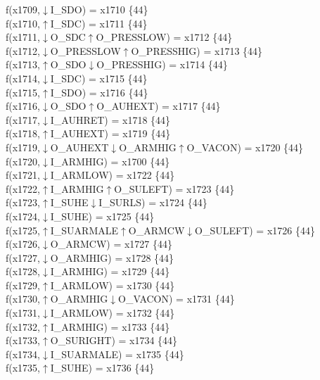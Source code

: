 f(x1709,$\downarrow$I\_SDO) = x1710 \{44\} \\  
f(x1710,$\uparrow$I\_SDC) = x1711 \{44\} \\  
f(x1711,$\downarrow$O\_SDC$\uparrow$O\_PRESSLOW) = x1712 \{44\} \\  
f(x1712,$\downarrow$O\_PRESSLOW$\uparrow$O\_PRESSHIG) = x1713 \{44\} \\  
f(x1713,$\uparrow$O\_SDO$\downarrow$O\_PRESSHIG) = x1714 \{44\} \\  
f(x1714,$\downarrow$I\_SDC) = x1715 \{44\} \\  
f(x1715,$\uparrow$I\_SDO) = x1716 \{44\} \\  
f(x1716,$\downarrow$O\_SDO$\uparrow$O\_AUHEXT) = x1717 \{44\} \\  
f(x1717,$\downarrow$I\_AUHRET) = x1718 \{44\} \\  
f(x1718,$\uparrow$I\_AUHEXT) = x1719 \{44\} \\  
f(x1719,$\downarrow$O\_AUHEXT$\downarrow$O\_ARMHIG$\uparrow$O\_VACON) = x1720 \{44\} \\  
f(x1720,$\downarrow$I\_ARMHIG) = x1700 \{44\} \\  
f(x1721,$\downarrow$I\_ARMLOW) = x1722 \{44\} \\  
f(x1722,$\uparrow$I\_ARMHIG$\uparrow$O\_SULEFT) = x1723 \{44\} \\  
f(x1723,$\uparrow$I\_SUHE$\downarrow$I\_SURLS) = x1724 \{44\} \\  
f(x1724,$\downarrow$I\_SUHE) = x1725 \{44\} \\  
f(x1725,$\uparrow$I\_SUARMALE$\uparrow$O\_ARMCW$\downarrow$O\_SULEFT) = x1726 \{44\} \\  
f(x1726,$\downarrow$O\_ARMCW) = x1727 \{44\} \\  
f(x1727,$\downarrow$O\_ARMHIG) = x1728 \{44\} \\  
f(x1728,$\downarrow$I\_ARMHIG) = x1729 \{44\} \\  
f(x1729,$\uparrow$I\_ARMLOW) = x1730 \{44\} \\  
f(x1730,$\uparrow$O\_ARMHIG$\downarrow$O\_VACON) = x1731 \{44\} \\  
f(x1731,$\downarrow$I\_ARMLOW) = x1732 \{44\} \\  
f(x1732,$\uparrow$I\_ARMHIG) = x1733 \{44\} \\  
f(x1733,$\uparrow$O\_SURIGHT) = x1734 \{44\} \\  
f(x1734,$\downarrow$I\_SUARMALE) = x1735 \{44\} \\  
f(x1735,$\uparrow$I\_SUHE) = x1736 \{44\} \\  

